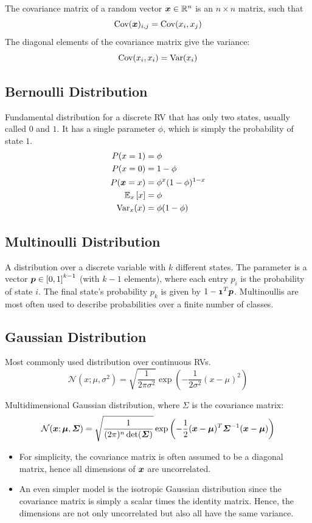 \begin{multicols}{2}
	The covariance matrix of a random vector $\bol{x}\in \mathbb{R}^n$ is an $n\times n$ matrix, such that
	\[ \cov(\bol{x})_{i,j}=\cov(x_i,x_j) \]
	The diagonal elements of the covariance matrix give the variance:
	\[ \text{Cov}(x_i,x_i) = \text{Var}(x_i) \]

	\subsection{Bernoulli Distribution}
	Fundamental distribution for a discrete RV that has only two states, usually called $0$ and $1$.
	It has a single parameter $\phi$, which is simply the probability of state $1$.
	\begin{align*}
	P(x=1) &= \phi \\
	P(x=0) &= 1-\phi\\
	P(\bol{x}=x) &= \phi^x(1-\phi)^{1-x}\\
	\Exp_x\left[x\right] &= \phi\\
	\var_x(x) &= \phi(1-\phi)
	\end{align*}

	\subsection{Multinoulli Distribution}
	A distribution over a discrete variable with $k$ different states.
	The parameter is a vector $\bol{p} \in \left[0,1\right]^{k-1}$ (with $k-1$ elements), where each entry $p_i$ is the probability of state $i$.
	The final state's probability $p_k$ is given by $1-\bol{1}^T\bol{p}$.
	Multinoullis are most often used to describe probabilities over a finite number of classes.

	\subsection{Gaussian Distribution}
	Most commonly used distribution over continuous RVs.
	\[ \mathcal{N}(x;\mu,\sigma^2) = \sqrt{\frac{1}{2\pi\sigma^2}}\exp\left(-\frac{1}{2\sigma^2}(x-\mu)^2\right) \]

	Multidimensional Gaussian distribution, where $\Sigma$ is the covariance matrix:
	\[ \mathcal{N}(\bol{x}; \bol{\mu},\bol{\Sigma}) =
	\sqrt{\frac{1}{(2\pi)^n\det(\bol{\Sigma})}}
	\exp \left( -\frac{1}{2} (\bol{x}-\bol{\mu})^T\bol{\Sigma}^{-1}(\bol{x}-\bol{\mu}) \right) \]

	\begin{itemize}
		\item For simplicity, the covariance matrix is often assumed to be a diagonal matrix, hence all dimensions of $\bol{x}$ are uncorrelated.
		\item An even simpler model is the isotropic Gaussian distribution since the covariance matrix is simply a scalar times the identity matrix. Hence, the dimensions are not only uncorrelated but also all have the same variance.
	\end{itemize}


\end{multicols}
